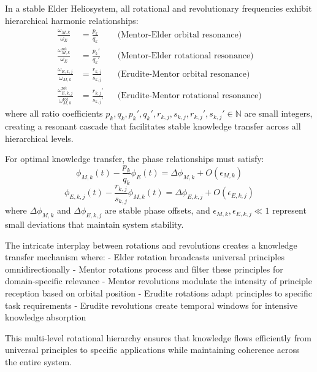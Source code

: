 \begin{theorem}
In a stable Elder Heliosystem, all rotational and revolutionary frequencies exhibit hierarchical harmonic relationships:
\begin{align}
\frac{\omega_{M,k}}{\omega_E} &= \frac{p_k}{q_k} && \text{(Mentor-Elder orbital resonance)} \\
\frac{\omega_{M,k}^{\text{rot}}}{\omega_E} &= \frac{p_k'}{q_k'} && \text{(Mentor-Elder rotational resonance)} \\
\frac{\omega_{E,k,j}}{\omega_{M,k}} &= \frac{r_{k,j}}{s_{k,j}} && \text{(Erudite-Mentor orbital resonance)} \\
\frac{\omega_{E,k,j}^{\text{rot}}}{\omega_{M,k}^{\text{rot}}} &= \frac{r_{k,j}'}{s_{k,j}'} && \text{(Erudite-Mentor rotational resonance)}
\end{align}
where all ratio coefficients $p_k, q_k, p_k', q_k', r_{k,j}, s_{k,j}, r_{k,j}', s_{k,j}' \in \mathbb{N}$ are small integers, creating a resonant cascade that facilitates stable knowledge transfer across all hierarchical levels.
\end{theorem}

\begin{corollary}
For optimal knowledge transfer, the phase relationships must satisfy:
\begin{equation}
\phi_{M,k}(t) - \frac{p_k}{q_k}\phi_E(t) = \Delta\phi_{M,k} + O(\epsilon_{M,k})
\end{equation}
\begin{equation}
\phi_{E,k,j}(t) - \frac{r_{k,j}}{s_{k,j}}\phi_{M,k}(t) = \Delta\phi_{E,k,j} + O(\epsilon_{E,k,j})
\end{equation}
where $\Delta\phi_{M,k}$ and $\Delta\phi_{E,k,j}$ are stable phase offsets, and $\epsilon_{M,k}, \epsilon_{E,k,j} \ll 1$ represent small deviations that maintain system stability.
\end{corollary}

The intricate interplay between rotations and revolutions creates a knowledge transfer mechanism where:
- Elder rotation broadcasts universal principles omnidirectionally
- Mentor rotations process and filter these principles for domain-specific relevance
- Mentor revolutions modulate the intensity of principle reception based on orbital position
- Erudite rotations adapt principles to specific task requirements
- Erudite revolutions create temporal windows for intensive knowledge absorption

This multi-level rotational hierarchy ensures that knowledge flows efficiently from universal principles to specific applications while maintaining coherence across the entire system.

